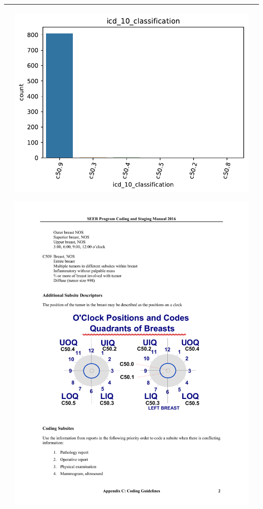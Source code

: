 \begin{table}[!htb]
\begin{threeparttable}
\begin{tabular}{p{2.5cm} p{7cm} p{6.5cm}}
			& \begin{center}\includegraphics[width=1\linewidth]{NOTEBOOK/IMAGENES_DESCRIPTIVAS/25_icd_10_classification}\end{center}
			
			\begin{center}\includegraphics[width=0.75\linewidth]{NOTEBOOK/IMAGENES_DESCRIPTIVAS/25_icd_Breast_Clock_Position}\end{center}
			\\ \hline
			

\end{tabular}
\end{threeparttable}
\end{table}

